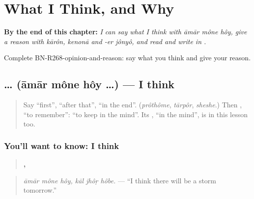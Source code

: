 
\chapter{What I Think, and Why}
\label{ch:bn-what-i-think-and-why}

\begin{chapteropening}
\textbf{By the end of this chapter:} \emph{I can say what I think with āmār mône hôy, give a reason with kārôn, kenonā and -er jônyô, and read and write  in .}

Complete BN-R268-opinion-and-reason: say what you think and give your reason.
\end{chapteropening}

\section[\texorpdfstring{\bn{আমার} \bn{মনে} \bn{হয়} … (āmār mône hôy …)}{আমার মনে হয় … (āmār mône hôy …)}]{   … (āmār mône hôy …) — I think}

\label{lesson:BN-C268-mone-hoy}



\begin{quote}
Say \textquotedblleft{}first\textquotedblright{}, \textquotedblleft{}after that\textquotedblright{}, \textquotedblleft{}in the end\textquotedblright{}. (\emph{prôthôme}, \emph{tārpôr}, \emph{sheshe}.) Then \textbf{ }, \textquotedblleft{}to remember\textquotedblright{}: \textquotedblleft{}to keep in the mind\textquotedblright{}. Its \textbf{}, \textquotedblleft{}in the mind\textquotedblright{}, is in this lesson too.
\end{quote}

\subsection*{You'll want to know: I think}
\begin{quote}
\textbf{  ,   }
\end{quote}

\begin{quote}
\emph{āmār mône hôy, kāl jhôṛ hôbe.} — \textquotedblleft{}I think there will be a storm tomorrow.\textquotedblright{}
\end{quote}

